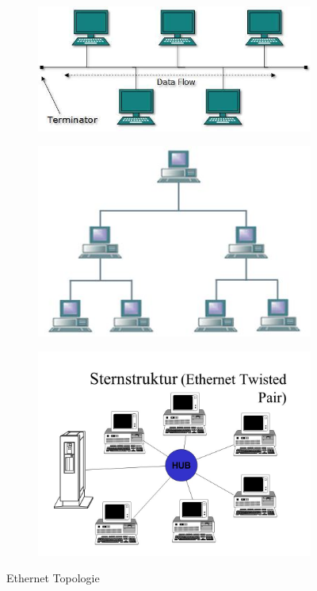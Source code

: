 \begin{figure}[h!]
	\centering
	\begin{subfigure}[b]{0.4\textwidth}
		\includegraphics[width=\linewidth]{bus_topology.jpg}
	\end{subfigure}
	\begin{subfigure}[b]{0.4\textwidth}
		\includegraphics[width=\linewidth]{tree_topology.jpg}
	\end{subfigure}
	\begin{subfigure}[b]{0.4\textwidth}
		\includegraphics[width=\linewidth]{stern_topology.jpg}
	\end{subfigure}
	\caption{Ethernet Topologie}
\end{figure}

